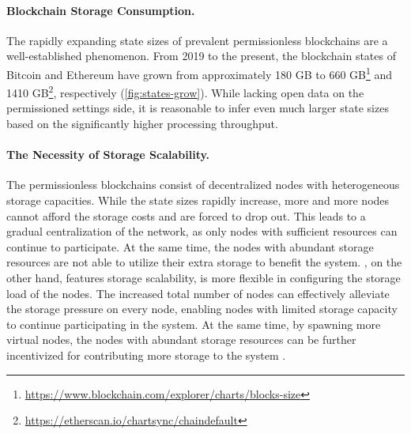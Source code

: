 \paragraph{Blockchain Storage Consumption.}
The rapidly expanding state sizes of prevalent permissionless blockchains are a well-established phenomenon.
From 2019 to the present, the blockchain states of Bitcoin and Ethereum have grown from approximately 180 GB to 660 GB\footnote{\url{https://www.blockchain.com/explorer/charts/blocks-size}} and 1410 GB\footnote{\url{https://etherscan.io/chartsync/chaindefault}}, respectively (\autoref{fig:states-grow}).
While lacking open data on the permissioned settings side, it is reasonable to infer even much larger state sizes based on the significantly higher processing throughput.


\paragraph{The Necessity of Storage Scalability.}
The permissionless blockchains consist of decentralized nodes with heterogeneous storage capacities.
While the state sizes rapidly increase, more and more nodes cannot afford the storage costs and are forced to drop out.
This leads to a gradual centralization of the network, as only nodes with sufficient resources can continue to participate.
At the same time, the nodes with abundant storage resources are not able to utilize their extra storage to benefit the system.
\sys, on the other hand, features storage scalability, is more flexible in configuring the storage load of the nodes.
The increased total number of nodes can effectively alleviate the storage pressure on every node, enabling nodes with limited storage capacity to continue participating in the system.
At the same time, by spawning more virtual nodes, the nodes with abundant storage resources can be further incentivized for contributing more storage to the system .

